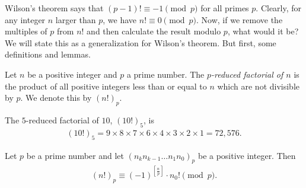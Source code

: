 \documentclass{subfile}
\begin{document}
Wilson's theorem says that $(p-1)! \equiv -1 \pmod p$ for all primes $p$. Clearly, for any integer $n$ larger than $p$, we have $n! \equiv 0 \pmod p$. Now, if we remove the multiples of $p$ from $n!$ and then calculate the result modulo $p$, what would it be? We will state this as a generalization for Wilson's theorem. But first, some definitions and lemmas.

	\begin{definition}
		Let $n$ be a positive integer and $p$ a prime number. The \textit{$p$-reduced factorial of $n$} is the product of all positive integers less than or equal to $n$ which are not divisible by $p$. We denote this by $(n!)_p$.
	\end{definition}
	
	\begin{example}
		The $5$-reduced factorial of $10$, $(10!)_5$, is
			\begin{align*}
				(10!)_5 = 9 \times 8 \times 7 \times 6 \times 4 \times 3 \times 2 \times 1 = 72,576.
			\end{align*}
	\end{example}
	
	
	\begin{theorem}\label{thm:reducedfactorialmodp}
		Let $p$ be a prime number and let $(n_k n_{k-1}\ldots n_1 n_0)_p$ be a positive integer. Then
			\begin{align*}
				(n!)_p\equiv (-1)^{\left[\frac{n}{p}\right]} \cdot n_0!\pmod p.
			\end{align*}
	\end{theorem}
	
\end{document}
